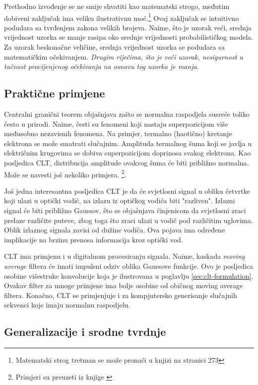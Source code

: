 Prethodno izvođenje se ne smije shvatiti kao matematski strogo, međutim dobiveni
zaključak ima veliku ilustrativnu moć.\footnote{Matematski strog tretman se može
pronaći u knjizi \cite{fristedt2013modern} na stranici 273} Ovaj zaključak se
intuitivno podudara sa tvrđenjem zakona velikih brojeva.  Naime, što je uzorak
veći, srednja vrijednost uzorka se manje rasipa oko srednje vrijednosti
probabilističkog modela. Za uzorak beskonačne veličine, srednja vrijednost
uzorka se podudara sa matematičkim očekivanjem.  \textit{Drugim riječima, što je
veći uzorak, nesigurnost u tačnost procijenjenog očekivanja na osnovu tog uzorka
je manja.}

\subsection{Praktične primjene}

Centralni granični teorem objašnjava zašto se normalna raspodjela susreće toliko
često u prirodi. Naime, česti su fenomeni koji nastaju superpozicijom više
međusobno nezavisnih fenomena. Na primjer, termalno (haotično) kretanje
elektrona se može smatrati slučajnim. Amplituda termalnog šuma koji se javlja u
električnim krugovima se dobiva superpozicijom doprinosa svakog elektrona. Kao
posljedica CLT, distribucija amplitude ovakvog šuma će biti približno normalna.
Može se navesti još nekoliko primjera. \footnote{Primjeri su preuzeti iz knjige
\cite{smith2003digital}}.


Još jedna interesantna posljedica CLT je da će svjetlosni signal u obliku
četvrtke koji ulazi u optički vodič, na izlazu iz optičkog vodiča biti
"razliven". Izlazni signal će biti približno Gaussov, što se objašnjava
činjenicom da svjetlosni zraci prelaze različite puteve, zbog toga što zraci
ulazi u vodič pod različitim uglovima. Oblik izlaznog signala zavisi od dužine
vodiča. Ova pojava ima određene implikacije na brzinu prenosa informacija kroz
optički vod.

CLT ima primjenu i u digitalnom procesiranju signala. Naime, kaskada
\textit{moving average} filtera će imati impulsni odziv oblika Gaussove
funkcije. Ovo je posljedica osobine višestruke konvolucije koja je ilustrovana u
poglavlju \ref{sec:clt-formulation}. Ovakav filter za mnoge primjene ima bolje
osobine od običnog moving average filtera.
Konačno, CLT se primjenjuje i za kompjutersko generisanje slučajnih sekvenci
koje imaju normalnu raspodjelu.

\subsection{Generalizacije i srodne tvrdnje}

